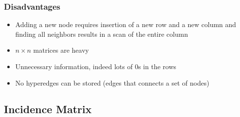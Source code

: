 \subsubsection{Disadvantages}
\begin{itemize}
    \item Adding a new node requires insertion of a new row and a new column and finding all neighbors results in a scan of the entire column
    \item \(n \times n\) matrices are heavy
    \item Unnecessary information, indeed lots of 0s in the rows
    \item No hyperedges can be stored (edges that connects a set of nodes)
\end{itemize}

\subsection{Incidence Matrix}
